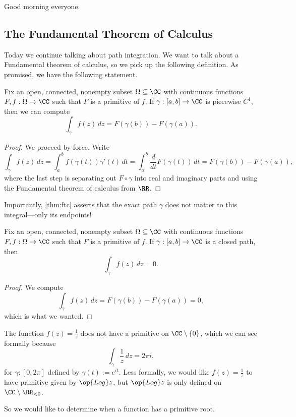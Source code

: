 
Good morning everyone.

\subsection{The Fundamental Theorem of Calculus}
Today we continue talking about path integration. We want to talk about a Fundamental theorem of calculus, so we pick up the following definition.
\primitivedef*
\noindent As promised, we have the following statement.
\begin{theorem} \label{thm:ftc}
	Fix an open, connected, nonempty subset $\Omega\subseteq\CC$ with continuous functions $F,f:\Omega\to\CC$ such that $F$ is a primitive of $f$. If $\gamma:[a,b]\to\CC$ is piecewise $C^1$, then we can compute
	\[\int_\gamma f(z)\,dz=F(\gamma(b))-F(\gamma(a)).\]
\end{theorem}
\begin{proof}
	We proceed by force. Write
	\[\int_\gamma f(z)\,dz=\int_a^b f(\gamma(t))\gamma'(t)\,dt=\int_a^b\frac d{dt}F(\gamma(t))\,dt=F(\gamma(b))-F(\gamma(a)),\]
	where the last step is separating out $F\circ\gamma$ into real and imaginary parts and using the Fundamental theorem of calculus from $\RR$.
\end{proof}
\begin{remark}
	Importantly, \autoref{thm:ftc} asserts that the exact path $\gamma$ does not matter to this integral---only its endpoints!
\end{remark}
\begin{corollary} \label{cor:ftconclosed}
	Fix an open, connected, nonempty subset $\Omega\subseteq\CC$ with continuous functions $F,f:\Omega\to\CC$ such that $F$ is a primitive of $f$. If $\gamma:[a,b]\to\CC$ is a closed path, then
	\[\int_\gamma f(z)\,dz=0.\]
\end{corollary}
\begin{proof}
	We compute
	\[\int_\gamma f(z)\,dz=F(\gamma(b))-F(\gamma(a))=0,\]
	which is what we wanted.
\end{proof}
\begin{example}
	The function $f(z)=\frac1z$ does not have a primitive on $\CC\setminus\{0\}$, which we can see formally because
	\[\int_\gamma\frac1z\,dz=2\pi i,\]
	for $\gamma:[0,2\pi]$ defined by $\gamma(t):=e^{it}$. Less formally, we would like $f(z)=\frac1z$ to have primitive given by $\op{Log}z$, but $\op{Log}z$ is only defined on $\CC\setminus\RR_{<0}$.
\end{example}
So we would like to determine when a function has a primitive root.

